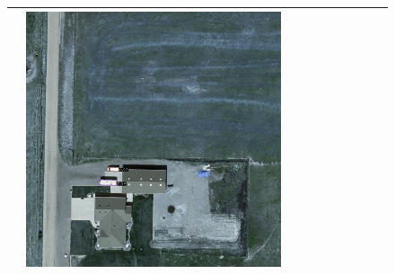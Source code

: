 \begin{figure}[H]
\begin{tabularx}{\textwidth}{c|*{9}{X}}
    & \includegraphics[trim={300pt 355pt 610pt 570pt},clip,width=\linewidth]{images/015Results/02perm_exp/comp_images/rgb/198.png} \\ \hline


\end{tabularx}
\end{figure}
